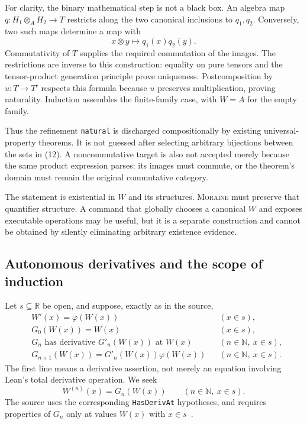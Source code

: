 \documentclass[11pt,letterpaper]{article}
\newcommand{\code}[1]{\nolinkurl{#1}}
\newcommand{\R}{\mathbb R}
\newcommand{\N}{\mathbb N}
\newcommand{\moraine}{\textsc{Moraine}}
\theoremstyle{definition}
\theoremstyle{remark}
\begin{document}
For clarity, the binary mathematical step is not a black box. An algebra map
$q:H_1\otimes_A H_2\to T$ restricts along the two canonical inclusions to
$q_1,q_2$. Conversely, two such maps determine a map with
\[
x\otimes y\longmapsto q_1(x)q_2(y).
\]
Commutativity of $T$ supplies the required commutation of the images. The
restrictions are inverse to this construction: equality on pure tensors and
the tensor-product generation principle prove uniqueness. Postcomposition by
$u:T\to T'$ respects this formula because $u$ preserves multiplication, proving
naturality. Induction assembles the finite-family case, with $W=A$ for the empty
family.

Thus the refinement \code{natural} is discharged compositionally by existing
universal-property theorems. It is not guessed after selecting arbitrary
bijections between the sets in (12). A noncommutative target is also not accepted
merely because the same product expression parses: its images must commute, or
the theorem's domain must remain the original commutative category.

The statement is existential in $W$ and its structures. \moraine{} must preserve
that quantifier structure. A command that globally chooses a canonical $W$ and
exposes executable operations may be useful, but it is a separate construction
and cannot be obtained by silently eliminating arbitrary existence evidence.

\subsection{Autonomous derivatives and the scope of induction}\label{sec:ode}
Let $s\subseteq\R$ be open, and suppose, exactly as in the source,
\[
\begin{aligned}
&W'(x)=\varphi(W(x)) &&(x\in s),\\
&G_0(W(x))=W(x) &&(x\in s),\\
&G_n\text{ has derivative }G'_n(W(x))\text{ at }W(x)
 &&(n\in\N,\ x\in s),\\
&G_{n+1}(W(x))=G'_n(W(x))\varphi(W(x))
 &&(n\in\N,\ x\in s).
\end{aligned}
\tag{14}
\]
The first line means a derivative assertion, not merely an equation involving
Lean's total derivative operation. We seek
\[
W^{(n)}(x)=G_n(W(x))\qquad(n\in\N,\ x\in s).
\tag{15}
\]
The source uses the corresponding \code{HasDerivAt} hypotheses, and requires
properties of $G_n$ only at values $W(x)$ with $x\in s$~\cite{PODE}.
\end{document}
